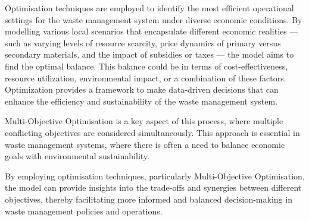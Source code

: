 
Optimisation techniques are employed to identify the most efficient operational settings for the waste management system under diverse economic conditions. By modelling various local scenarios that encapsulate different economic realities –-- such as varying levels of resource scarcity, price dynamics of primary versus secondary materials, and the impact of subsidies or taxes –-- the model aims to find the optimal balance. This balance could be in terms of cost-effectiveness, resource utilization, environmental impact, or a combination of these factors. Optimization provides a framework to make data-driven decisions that can enhance the efficiency and sustainability of the waste management system.

Multi-Objective Optimisation is a key aspect of this process, where multiple conflicting objectives are considered simultaneously. This approach is essential in waste management systems, where there is often a need to balance economic goals with environmental sustainability. 

By employing optimisation techniques, particularly Multi-Objective Optimisation, the model can provide insights into the trade-offs and synergies between different objectives, thereby facilitating more informed and balanced decision-making in waste management policies and operations.


